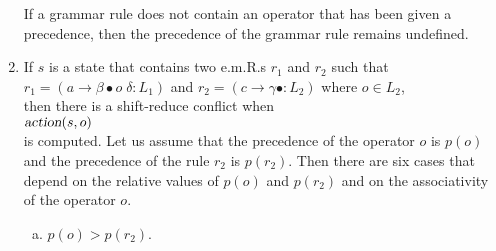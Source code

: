 \begin{enumerate}
      If a grammar rule does not contain an operator that has been given a precedence, then the precedence of
      the grammar rule remains undefined.
\item If $s$ is a state that contains two e.m.R.s  $r_1$ and  $r_2$ such that
      \\[0.2cm]
      \hspace*{1.3cm}
      $r_1 = (a \rightarrow \beta \bullet o \;\delta:L_1)$ \quad and \quad
      $r_2 = (c \rightarrow \gamma \bullet : L_2)$ \quad where \quad $o \in L_2$,
      \\[0.2cm]
      then there is a shift-reduce conflict when 
      \\[0.2cm]
      \hspace*{1.3cm}
      $\textsl{action}(s, o)$
      \\[0.2cm]
      is computed. Let us assume that the precedence of the operator  $o$ is  $p(o)$
      and the precedence of the rule $r_2$ is  $p(r_2)$.  Then there are six cases that depend
      on the relative values of $p(o)$ and $p(r_2)$ and on the associativity of the operator $o$.
      \begin{enumerate}[(a)]
      \item $p(o) > p(r_2)$.
        

\end{enumerate}
\end{enumerate}
